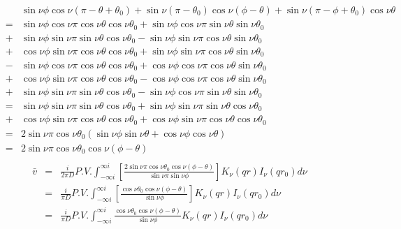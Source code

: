\documentclass{article}
\begin{document}
\begin{eqnarray}
            & & \sin\nu\phi\cos\nu (\pi - \theta + \theta_0) +
                \sin\nu(\pi - \theta_0)\cos\nu(\phi - \theta) +
                \sin\nu(\pi-\phi+\theta_0)\cos\nu\theta\nonumber \\
            &=& \sin\nu\phi\cos\nu\pi\cos\nu\theta\cos\nu\theta_0 + \sin\nu\phi\cos\nu\pi\sin\nu\theta\sin\nu\theta_0 \nonumber \\
            &+& \sin\nu\phi\sin\nu\pi\sin\nu\theta\cos\nu\theta_0 - \sin\nu\phi\sin\nu\pi\cos\nu\theta\sin\nu\theta_0 \nonumber \\
            &+& \cos\nu\phi\sin\nu\pi\cos\nu\theta\cos\nu\theta_0 + \sin\nu\phi\sin\nu\pi\cos\nu\theta\sin\nu\theta_0 \nonumber \\
            &-& \sin\nu\phi\cos\nu\pi\cos\nu\theta\cos\nu\theta_0 + \cos\nu\phi\cos\nu\pi\cos\nu\theta\sin\nu\theta_0 \nonumber \\
            &+& \cos\nu\phi\sin\nu\pi\cos\nu\theta\cos\nu\theta_0 - \cos\nu\phi\cos\nu\pi\cos\nu\theta\sin\nu\theta_0 \nonumber \\
            &+& \sin\nu\phi\sin\nu\pi\sin\nu\theta\cos\nu\theta_0 - \sin\nu\phi\cos\nu\pi\sin\nu\theta\sin\nu\theta_0 \nonumber \\
            &=& \sin\nu\phi\sin\nu\pi\sin\nu\theta\cos\nu\theta_0 + \sin\nu\phi\sin\nu\pi\sin\nu\theta\cos\nu\theta_0 \nonumber \\
            &+& \cos\nu\phi\sin\nu\pi\cos\nu\theta\cos\nu\theta_0 + \cos\nu\phi\sin\nu\pi\cos\nu\theta\cos\nu\theta_0 \nonumber \\
            &=& 2\sin\nu\pi\cos\nu\theta_0(\sin\nu\phi\sin\nu\theta+ \cos\nu\phi\cos\nu\theta)\nonumber \\
            &=& 2\sin\nu\pi\cos\nu\theta_0\cos\nu(\phi - \theta)\nonumber \\
\end{eqnarray}
\begin{eqnarray}
    \bar{v} &=& \frac{i}{2\pi D}P.V.\int^{\infty i}_{-\infty i}\left[
                \frac{2\sin\nu\pi\cos\nu\theta_0\cos\nu(\phi - \theta)}
                    {\sin\nu\pi\sin\nu\phi}\right] K_\nu(qr)I_\nu(qr_0)d\nu \nonumber \\
            &=& \frac{i}{\pi D}P.V.\int^{\infty i}_{-\infty i}\left[
                \frac{\cos\nu\theta_0\cos\nu(\phi - \theta)}{\sin\nu\phi}
                \right] K_\nu(qr)I_\nu(qr_0)d\nu \nonumber \\
            &=& \frac{i}{\pi D}P.V.\int^{\infty i}_{-\infty i}
                \frac{\cos\nu\theta_0\cos\nu(\phi - \theta)}{\sin\nu\phi}
                K_\nu(qr)I_\nu(qr_0)d\nu\label{bar-v}
\end{eqnarray}
\end{document}
